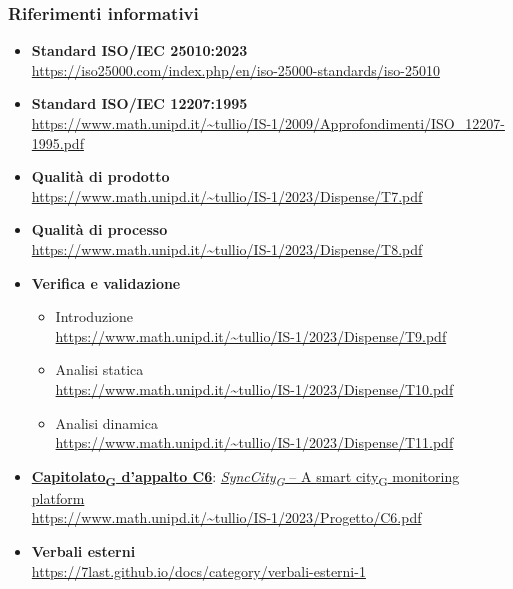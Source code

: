 \subsubsection{Riferimenti informativi}
\begin{itemize}
    \item \textbf{Standard ISO/IEC 25010:2023} \\
        \url{https://iso25000.com/index.php/en/iso-25000-standards/iso-25010}
    \item \textbf{Standard ISO/IEC 12207:1995} \\
        \url{https://www.math.unipd.it/~tullio/IS-1/2009/Approfondimenti/ISO_12207-1995.pdf}
    \item \textbf{Qualità di prodotto} \\
        \url{https://www.math.unipd.it/~tullio/IS-1/2023/Dispense/T7.pdf}
    \item \textbf{Qualità di processo} \\
        \url{https://www.math.unipd.it/~tullio/IS-1/2023/Dispense/T8.pdf}
    \item \textbf{Verifica e validazione}
        \begin{itemize}
            \item Introduzione \\
                \url{https://www.math.unipd.it/~tullio/IS-1/2023/Dispense/T9.pdf}
            \item Analisi statica \\
                \url{https://www.math.unipd.it/~tullio/IS-1/2023/Dispense/T10.pdf}
            \item Analisi dinamica \\
                \url{https://www.math.unipd.it/~tullio/IS-1/2023/Dispense/T11.pdf}
        \end{itemize}
	\item \href{https://7last.github.io/docs/rtb/documentazione-interna/glossario\#capitolato}{\textbf{Capitolato\textsubscript{G} d'appalto C6}}: \href{https://7last.github.io/docs/rtb/documentazione-interna/glossario\#synccity}{\textit{SyncCity\textsubscript{G} } – A \href{https://7last.github.io/docs/rtb/documentazione-interna/glossario\#smart-city}{smart city\textsubscript{G}} monitoring platform}\\
    \url{https://www.math.unipd.it/~tullio/IS-1/2023/Progetto/C6.pdf}
    \item \textbf{Verbali esterni} \\
        \url{https://7last.github.io/docs/category/verbali-esterni-1}

\end{itemize}
